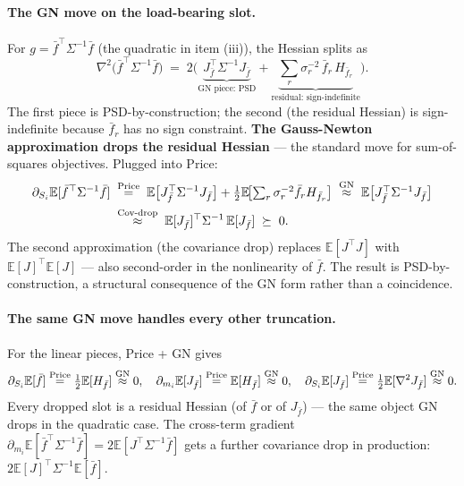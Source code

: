 \documentclass[11pt]{article}
\newcommand{\E}{\mathbb{E}}
\begin{document}
\paragraph{The GN move on the load-bearing slot.}
For $g = \bar f^\top \Sigma^{-1}\bar f$ (the quadratic in item (iii)),
the Hessian splits as
\begin{equation}
\nabla^2 \!\bigl(\bar f^\top \Sigma^{-1}\bar f\bigr) \;=\; 2\bigl(
\underbrace{J_{\bar f}^\top \Sigma^{-1} J_{\bar f}}_{\text{GN piece: PSD}}
+ \underbrace{\textstyle\sum_r \sigma_r^{-2}\,\bar f_r\,H_{\bar f_r}}_{\text{residual: sign-indefinite}}\bigr).
\label{eq:gn-hessian}
\end{equation}
The first piece is PSD-by-construction; the second (the residual
Hessian) is sign-indefinite because $\bar f_r$ has no sign constraint.
\textbf{The Gauss-Newton approximation drops the residual Hessian} ---
the standard move for sum-of-squares objectives. Plugged into Price:
\begin{equation}
\begin{aligned}
\partial_{S_i} \E[\bar f^\top \Sigma^{-1}\bar f]
&\;\stackrel{\rm Price}{=}\; \E\bigl[J_{\bar f}^\top \Sigma^{-1} J_{\bar f}\bigr]
   + \tfrac{1}{2}\E\!\bigl[\textstyle\sum_r \sigma_r^{-2}\bar f_r H_{\bar f_r}\bigr]
\;\stackrel{\rm GN}{\approx}\;
\E\bigl[J_{\bar f}^\top \Sigma^{-1} J_{\bar f}\bigr]\\
&\;\stackrel{\rm Cov\text{-}drop}{\approx}\;
\E[J_{\bar f}]^\top \Sigma^{-1}\,\E[J_{\bar f}] \;\succeq\; 0.
\end{aligned}
\label{eq:Eff-lin}
\end{equation}
The second approximation (the covariance drop) replaces $\E[J^\top J]$
with $\E[J]^\top \E[J]$ --- also second-order in the nonlinearity of
$\bar f$. The result is PSD-by-construction, a structural consequence
of the GN form rather than a coincidence.

\paragraph{The same GN move handles every other truncation.}
For the linear pieces, Price + GN gives
\begin{equation}
\partial_{S_i} \E[\bar f]    \stackrel{\rm Price}{=} \tfrac{1}{2}\E[H_{\bar f}]
                                \stackrel{\rm GN}{\approx} 0,
\quad
\partial_{m_i} \E[J_{\bar f}] \stackrel{\rm Price}{=} \E[H_{\bar f}]
                                \stackrel{\rm GN}{\approx} 0,
\quad
\partial_{S_i} \E[J_{\bar f}] \stackrel{\rm Price}{=} \tfrac{1}{2}\E[\nabla^2 J_{\bar f}]
                                \stackrel{\rm GN}{\approx} 0.
\end{equation}
Every dropped slot is a residual Hessian (of $\bar f$ or of
$J_{\bar f}$) --- the same object GN drops in the quadratic case.
The cross-term gradient
$\partial_{m_i}\E[\bar f^\top \Sigma^{-1}\bar f] = 2\E[J^\top \Sigma^{-1}\bar f]$
gets a further covariance drop in production:
$2\E[J]^\top \Sigma^{-1}\E[\bar f]$.
\end{document}
